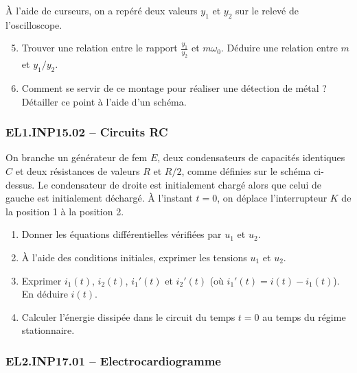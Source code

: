 À l'aide de curseurs, on a repéré deux valeurs $y_1$ et $y_2$ sur le relevé de l'oscilloscope.

\begin{enumerate}
    \setcounter{enumi}{4}
    \item Trouver une relation entre le rapport $\frac{y_1}{y_2}$ et $m\omega_0$. Déduire une relation entre $m$ et $y_1/y_2$.
    \item Comment se servir de ce montage pour réaliser une détection de métal ? Détailler ce point à l'aide d'un schéma.
\end{enumerate}

\newpage
\subsubsection*{EL1.INP15.02 -- Circuits RC  \corrige}

\begin{center}
\end{center}

On branche un générateur de fem $E$, deux condensateurs de capacités identiques $C$ et deux résistances de valeurs $R$ et $R/2$, comme définies sur le schéma ci-dessus. Le condensateur de droite est initialement chargé alors que celui de gauche est initialement déchargé. À l'instant $t = 0$, on déplace l'interrupteur $K$ de la position 1 à la position 2.

\begin{enumerate}
    \item Donner les équations différentielles vérifiées par $u_1$ et $u_2$.
    \item À l'aide des conditions initiales, exprimer les tensions $u_1$ et $u_2$.
    \item Exprimer $i_1(t)$, $i_2(t)$, $i_1'(t)$ et $i_2'(t)$ (où $i_1'(t) = i(t) - i_1(t)$). En déduire $i(t)$.
    \item Calculer l'énergie dissipée dans le circuit du temps $t = 0$ au temps du régime stationnaire.
\end{enumerate}

\newpage
\subsubsection*{EL2.INP17.01 -- Electrocardiogramme  \corrige}

\begin{center}
\end{center}

